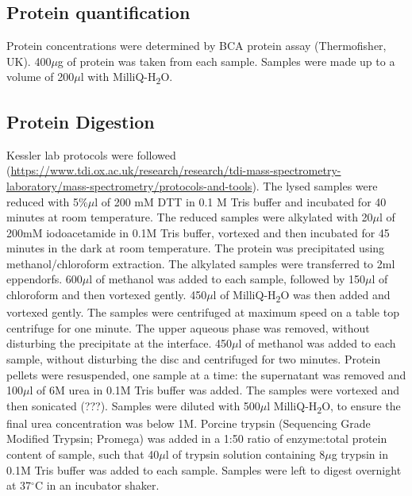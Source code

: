 \subsection{Protein quantification}
Protein concentrations were determined by BCA protein assay (Thermofisher, UK). 400$\mu$g of protein was taken from each sample. Samples were made up to a volume of 200$\mu$l with MilliQ-H\textsubscript{2}O.

\subsection{Protein Digestion}
Kessler lab protocols were followed (\url{https://www.tdi.ox.ac.uk/research/research/tdi-mass-spectrometry-laboratory/mass-spectrometry/protocols-and-tools}).
The lysed samples were reduced with 5\%$\mu$l of 200 mM DTT in 0.1 M Tris buffer and incubated for 40 minutes at room temperature. The reduced samples were alkylated with 20$\mu$l of 200mM iodoacetamide in 0.1M Tris buffer, vortexed and then incubated for 45 minutes in the dark at room temperature.
The protein was precipitated using methanol/chloroform extraction. The alkylated samples were transferred to 2ml eppendorfs. 600$\mu$l of methanol was added to each sample, followed by 150$\mu$l of chloroform and then vortexed gently. 450$\mu$l of MilliQ-H\textsubscript{2}O was then added and vortexed gently. The samples were centrifuged at maximum speed on a table top centrifuge for one minute. The upper aqueous phase was removed, without disturbing the precipitate at the interface. 450$\mu$l of methanol was added to each sample, without disturbing the disc and centrifuged for two minutes. Protein pellets were resuspended, one sample at a time: the supernatant was removed and 100$\mu$l of 6M urea in 0.1M Tris buffer was added. The samples were vortexed and then sonicated (???). Samples were diluted with 500$\mu$l MilliQ-H\textsubscript{2}O, to ensure the final urea concentration was below 1M. Porcine trypsin (Sequencing Grade Modified Trypsin; Promega) was added in a 1:50 ratio of enzyme:total protein content of sample, such that 40$\mu$l of trypsin solution containing 8$\mu$g trypsin in 0.1M Tris buffer was added to each sample. Samples were left to digest overnight at 37$^{\circ}$C in an incubator shaker.

